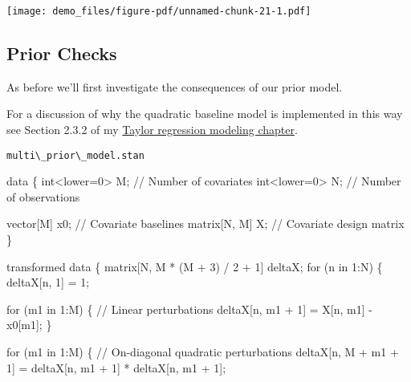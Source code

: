 \documentclass[
  letterpaper,
  DIV=11,
  numbers=noendperiod]{scrartcl}
\newenvironment{Shaded}{\begin{snugshade}}{\end{snugshade}}
\newcommand{\CommentTok}[1]{\textcolor[rgb]{0.37,0.37,0.37}{#1}}
\newcommand{\ControlFlowTok}[1]{\textcolor[rgb]{0.00,0.23,0.31}{#1}}
\newcommand{\DataTypeTok}[1]{\textcolor[rgb]{0.68,0.00,0.00}{#1}}
\newcommand{\DecValTok}[1]{\textcolor[rgb]{0.68,0.00,0.00}{#1}}
\newcommand{\KeywordTok}[1]{\textcolor[rgb]{0.00,0.23,0.31}{#1}}
\newcommand{\NormalTok}[1]{\textcolor[rgb]{0.00,0.23,0.31}{#1}}
\begin{document}
\texttt{[image: demo\_files/figure-pdf/unnamed-chunk-21-1.pdf]}

\subsection{Prior Checks}\label{prior-checks-1}

As before we'll first investigate the consequences of our prior model.

For a discussion of why the quadratic baseline model is implemented in
this way see Section 2.3.2 of my
\href{https://betanalpha.github.io/assets/case_studies/taylor_models.html\#232_Higher-Order_Implementations}{Taylor
regression modeling chapter}.

\begin{codelisting}

\caption{\texttt{multi\textbackslash\_prior\textbackslash\_model.stan}}

\begin{Shaded}
\begin{Highlighting}[]
\KeywordTok{data}\NormalTok{ \{}
  \DataTypeTok{int}\NormalTok{\textless{}}\KeywordTok{lower}\NormalTok{=}\DecValTok{0}\NormalTok{\textgreater{} M;  }\CommentTok{// Number of covariates}
  \DataTypeTok{int}\NormalTok{\textless{}}\KeywordTok{lower}\NormalTok{=}\DecValTok{0}\NormalTok{\textgreater{} N;  }\CommentTok{// Number of observations}
  
  \DataTypeTok{vector}\NormalTok{[M] x0;    }\CommentTok{// Covariate baselines}
  \DataTypeTok{matrix}\NormalTok{[N, M] X;  }\CommentTok{// Covariate design matrix}
\NormalTok{\}}

\KeywordTok{transformed data}\NormalTok{ \{}
  \DataTypeTok{matrix}\NormalTok{[N, M * (M + }\DecValTok{3}\NormalTok{) / }\DecValTok{2}\NormalTok{ + }\DecValTok{1}\NormalTok{] deltaX;}
  \ControlFlowTok{for}\NormalTok{ (n }\ControlFlowTok{in} \DecValTok{1}\NormalTok{:N) \{}
\NormalTok{    deltaX[n, }\DecValTok{1}\NormalTok{] = }\DecValTok{1}\NormalTok{;}
    
    \ControlFlowTok{for}\NormalTok{ (m1 }\ControlFlowTok{in} \DecValTok{1}\NormalTok{:M) \{}
      \CommentTok{// Linear perturbations}
\NormalTok{      deltaX[n, m1 + }\DecValTok{1}\NormalTok{] = X[n, m1] {-} x0[m1];}
\NormalTok{    \}}
    
    \ControlFlowTok{for}\NormalTok{ (m1 }\ControlFlowTok{in} \DecValTok{1}\NormalTok{:M) \{}
      \CommentTok{// On{-}diagonal quadratic perturbations}
\NormalTok{      deltaX[n, M + m1 + }\DecValTok{1}\NormalTok{] }
\NormalTok{        = deltaX[n, m1 + }\DecValTok{1}\NormalTok{] * deltaX[n, m1 + }\DecValTok{1}\NormalTok{];}
  

\end{Highlighting}
\end{Shaded}
\end{codelisting}
\end{document}
